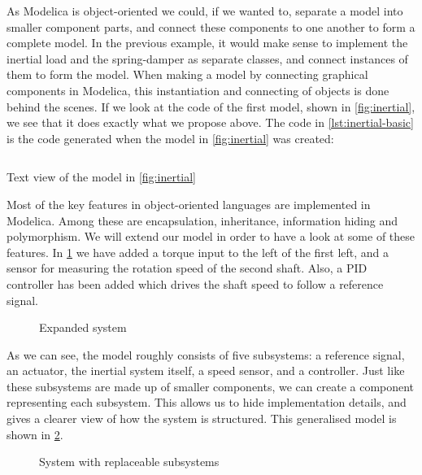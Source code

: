 \documentclass[\rootfolder/main.tex]{subfiles}
\begin{document}
As Modelica is object-oriented we could, if we wanted to, separate a model into smaller component parts, and connect these components to one another to form a complete model.
In the previous example, it would make sense to implement the inertial load and the spring-damper as separate classes, and connect instances of them to form the model.
When making a model by connecting graphical components in Modelica, this instantiation and connecting of objects is done behind the scenes.
If we look at the code of the first model, shown in \cref{fig:inertial}, we see that it does exactly what we propose above.
The code in \cref{lst:inertial-basic} is the code generated when the model in \cref{fig:inertial} was created\footnotemark:


\begin{listing}[ht]
    \inputminted[fontsize=\footnotesize]{Modelica}{\rootfolder/Models/MasterProject/Models/InertialBasic2.mo}
    \caption{Text view of the model in \cref{fig:inertial}}
    \label{lst:inertial-basic}
\end{listing}

Most of the key features in object-oriented languages are implemented in Modelica.
Among these are encapsulation, inheritance, information hiding and polymorphism.
We will extend our model in order to have a look at some of these features.
In \cref{fig:inertial-expanded} we have added a torque input to the left of the first left, and a sensor for measuring the rotation speed of the second shaft.
Also, a PID controller has been added which drives the shaft speed to follow a reference signal.

\begin{figure}[ht]
	\caption{Expanded system}
	\label{fig:inertial-expanded}
\end{figure}

As we can see, the model roughly consists of five subsystems: a reference signal, an actuator, the inertial system itself, a speed sensor, and a controller.
Just like these subsystems are made up of smaller components, we can create a component representing each subsystem.
This allows us to hide implementation details, and gives a clearer view of how the system is structured.
This generalised model is shown in \cref{fig:inertial-architecture}.

\begin{figure}[ht]
	\caption{System with replaceable subsystems}
	\label{fig:inertial-architecture}
\end{figure}
\end{document}
